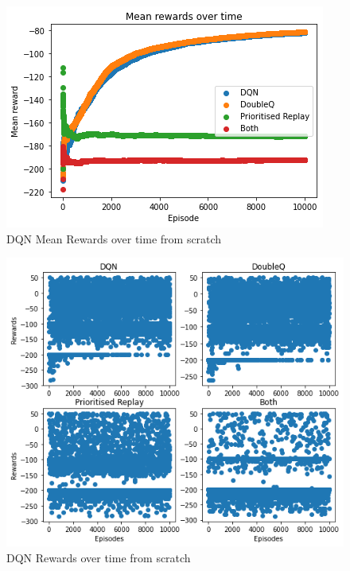 \documentclass[a4pape, 11pt, english]{article}
\begin{document}
\begin{figure}[h!]
	\begin{center}
		\includegraphics{img/DQNRewardsOverTimeRaw.png}
		\caption{DQN Mean Rewards over time from scratch}
		\label{fig:DQNRewardsOverTimeRaw}
	\end{center}
\end{figure}

\begin{figure}[h!]
	\begin{center}
		\includegraphics{img/rewardsDetailedRaw.png}
		\caption{DQN Rewards over time from scratch}
		\label{fig:rewardsDetailedRaw}
	\end{center}
\end{figure}

\end{document}
